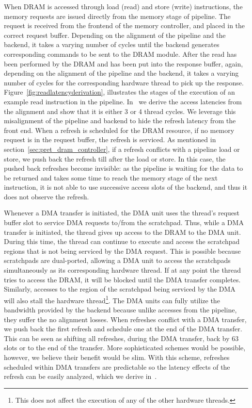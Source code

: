 When DRAM is accessed through load (read) and store (write) instructions, the memory requests are issued directly from the memory stage of pipeline.
The request is received from the frontend of the memory controller, and placed in the correct request buffer. 
Depending on the alignment of the pipeline and the backend, it takes a varying number of cycles until the backend generates corresponding commands to be sent to the DRAM module.
After the read has been performed by the DRAM and has been put into the response buffer, again, depending on the alignment of the pipeline and the backend, it takes a varying number of cycles for the corresponding hardware thread to pick up the response.
Figure~\ref{fig:readlatencyderivation}, illustrates the stages of the execution of an example read instruction in the pipeline.
In~\cite{ReinekeLiuPatelKimLee11_PRETDRAMControllerBankPrivatizationForPredictability} we derive the access latencies from the alignment and show that it is either 3 or 4 thread cycles.    
We leverage this misalignment of the pipeline and backend to hide the refresh latency from the front end. 
When a refresh is scheduled for the DRAM resource, if no memory request is in the request buffer, the refresh is serviced.
As mentioned in section~\ref{sec:pret_dram_controller}, if a refresh conflicts with a pipeline load or store, we push back the refresh till after the load or store. 
In this case, the pushed back refreshes become invisible:   
as the pipeline is waiting for the data to be returned and takes some time to reach the memory stage of the next instruction, it is not able to use successive access slots of the backend, and thus it does not observe the refresh.

Whenever a DMA transfer is initiated, the DMA unit uses the thread's request buffer slot to service DMA requests to/from the scratchpad. 
Thus, while a DMA transfer is initiated, the thread gives up access to the DRAM to the DMA unit.
During this time, the thread can continue to execute and access the scratchpad regions that is not being serviced by the DMA request. 
This is possible because scratchpads are dual-ported, allowing a DMA unit to access the scratchpads simultaneously as its corresponding hardware thread.
If at any point the thread tries to access the DRAM, it will be blocked until the DMA transfer completes.
Similarly, accesses to the region of the scratchpad being serviced by the DMA will also stall the hardware thread\footnote{This does not affect the execution of any of the other hardware threads.}.
The DMA units can fully utilize the bandwidth provided by the backend because unlike accesses from the pipeline, they suffer the no alignment losses.
When refreshes conflict with a DMA transfer, we push back the first refresh and schedule one at the end of the DMA transfer. 
This can be seen as shifting all refreshes, during the DMA transfer, back by $63$ slots or to the end of the transfer.
More sophisticated schemes would be possible, however, we believe their benefit would be slim.
With this scheme, refreshes scheduled within DMA transfers are predictable so the latency effects of the refresh can be easily analyzed, which we derive in~\cite{ReinekeLiuPatelKimLee11_PRETDRAMControllerBankPrivatizationForPredictability}.

